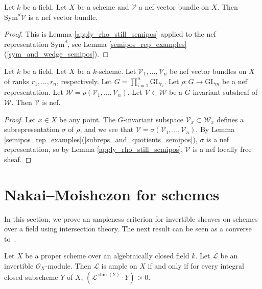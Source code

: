 \begin{lemma}\label{symd_semipos}
Let $k$ be a field.
Let $X$ be a scheme and $\mathcal{V}$ a nef vector bundle on $X$.
Then $\mathrm{Sym}^d\mathcal{V}$ is a nef vector bundle.
\end{lemma}
\begin{proof}
This is Lemma \ref{apply_rho_still_semipos} applied to the nef
representation $\mathrm{Sym}^d$, see Lemma
\ref{semipos_rep_examples}(\ref{sym_and_wedge_semipos}).
\end{proof}


\begin{lemma}
Let $k$ be a field.
Let $X$ be a $k$-scheme.
Let $\mathcal{V}_1,\ldots,\mathcal{V}_n$ be nef vector bundles on $X$
of ranks $r_1,\ldots,r_n$, respectively.
Let $G = \prod_{i=1}^n \mathrm{GL}_{r_i}$.
Let $\rho : G \to \mathrm{GL}_m$ be a nef representation.
Let $\mathcal{W} = \rho(\mathcal{V}_1,\ldots,\mathcal{V}_n)$.
Let $\mathcal{V} \subset \mathcal{W}$ be a $G$-invariant subsheaf of $\mathcal{W}$.
Then $\mathcal{V}$ is nef.
\end{lemma}

\begin{proof}
Let $x\in X$ be any point.
The $G$-invariant subspace $\mathcal{V}_x \subset \mathcal{W}_x$ defines a
subrepresentation $\sigma$ of $\rho$, and we see that
$\mathcal{V} = \sigma(\mathcal{V}_1,\ldots,\mathcal{V}_n)$.
By Lemma \ref{semipos_rep_examples}(\ref{subreps_and_quotients_semipos}),
$\sigma$ is a nef representation, so by Lemma
\ref{apply_rho_still_semipos}, $\mathcal{V}$ is a nef locally free
sheaf.
\end{proof}

\section{Nakai--Moishezon for schemes}
In this section, we prove an ampleness criterion for invertible sheaves on
schemes over a field using intersection theory.
The next result can be seen as a converse to~.

\begin{lemma}
\label{schemes-lemma-nakai-moishezon}
Let $X$ be a proper scheme over an algebraically closed field $k$.
Let $\mathcal{L}$ be an invertible $\mathcal{O}_X$-module.
Then $\mathcal{L}$ is ample on $X$ if and only if
for every integral closed subscheme $Y$ of $X$,
$(\mathcal{L}^{\dim(Y)} \cdot Y) > 0$.
\end{lemma}

